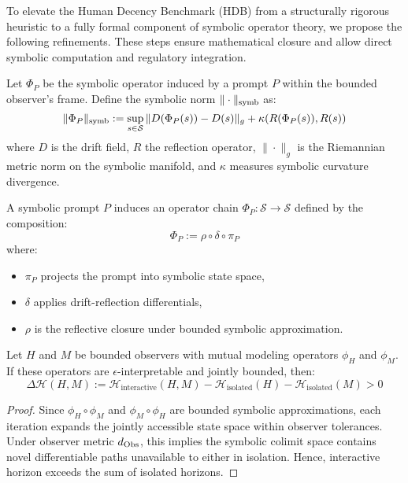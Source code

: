 To elevate the Human Decency Benchmark (HDB) from a structurally rigorous heuristic to a fully formal component of symbolic operator theory, we propose the following refinements. These steps ensure mathematical closure and allow direct symbolic computation and regulatory integration.

\begin{definition}
\label{definition:bk7_symbolic_norm}
Let $\Phi_P$ be the symbolic operator induced by a prompt $P$ within the bounded observer's frame. Define the symbolic norm $\|\cdot\|_{\mathrm{symb}}$ as:
\[
\|\Phi_P\|_{\mathrm{symb}} := \sup_{s \in \mathcal{S}} \|D(\Phi_P(s)) - D(s)\|_g + \kappa(R(\Phi_P(s)), R(s))
\]
where $D$ is the drift field, $R$ the reflection operator, $\|\cdot\|_g$ is the Riemannian metric norm on the symbolic manifold, and $\kappa$ measures symbolic curvature divergence.
\end{definition}

\begin{definition}
\label{definition:bk7_prompt_operator_chain}
A symbolic prompt $P$ induces an operator chain $\Phi_P: \mathcal{S} \to \mathcal{S}$ defined by the composition:
\[
\Phi_P := \rho \circ \delta \circ \pi_P
\]
where:
\begin{itemize}
    \item $\pi_P$ projects the prompt into symbolic state space,
    \item $\delta$ applies drift-reflection differentials,
    \item $\rho$ is the reflective closure under bounded symbolic approximation.
\end{itemize}
\end{definition}

\begin{lemma}
\label{lemma:bk7_symbolic_expansion}
Let $H$ and $M$ be bounded observers with mutual modeling operators $\phi_H$ and $\phi_M$. If these operators are $\epsilon$-interpretable and jointly bounded, then:
\[
\Delta \mathcal{H}(H, M) := \mathcal{H}_{\text{interactive}}(H, M) - \mathcal{H}_{\text{isolated}}(H) - \mathcal{H}_{\text{isolated}}(M) > 0
\]
\end{lemma}

\begin{proof}
Since $\phi_H \circ \phi_M$ and $\phi_M \circ \phi_H$ are bounded symbolic approximations, each iteration expands the jointly accessible state space within observer tolerances. Under observer metric $d_{\mathrm{Obs}}$, this implies the symbolic colimit space contains novel differentiable paths unavailable to either in isolation. Hence, interactive horizon exceeds the sum of isolated horizons.
\end{proof}

